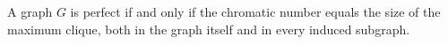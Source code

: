 \documentclass[preview]{standalone}
\begin{document}
\begin{center}
A graph $G$ is perfect if and only if the chromatic number equals the size of the maximum clique, both in the graph itself and in every induced subgraph.
\end{center}
\end{document}
